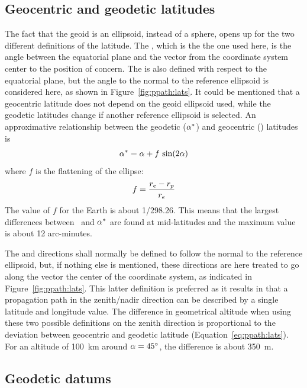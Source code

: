 \subsection{Geocentric and geodetic latitudes}
\label{sec:ppath:geolat}

The fact that the geoid is an ellipsoid, instead of a sphere, opens up
for the two different definitions of the latitude. The
, which is the the one used here, is the
angle between the equatorial plane and the vector from the coordinate
system center to the position of concern. The  is also defined with respect to the equatorial plane, but
the angle to the normal to the reference ellipsoid is considered here, as
shown in Figure~\ref{fig:ppath:lats}. It could be mentioned that a
geocentric latitude does not depend on the geoid ellipsoid used, while
the geodetic latitudes change if another reference ellipsoid is
selected. An approximative relationship between the geodetic
($\alpha^*$) and geocentric (\Lat) latitudes is \citep{montenbruck:00}
\begin{equation}
 \alpha^* = \alpha + f\,\sin(2\alpha)  
 \label{eq:ppath:lats}
\end{equation}
where $f$ is the flattening of the ellipse:
\begin{equation}
 f = \frac{r_{e}-r_{p}}{r_{e}}
 \label{eq:ppath:flattening}
\end{equation}
The value of $f$ for the Earth is about 1/298.26. This means that the
largest differences between \Lat\ and $\alpha^*$ are found at
mid-latitudes and the maximum value is about 12 arc-minutes.

The  and  directions shall normally be
defined to follow the normal to the reference ellipsoid, but, if
nothing else is mentioned, these directions are here treated to go
along the vector the center of the coordinate system, as indicated in
Figure~\ref{fig:ppath:lats}. This latter definition is preferred
as it results in that a propagation path in the zenith/nadir direction
can be described by a single latitude and longitude value. The
difference in geometrical altitude when using these two possible
definitions on the zenith direction is proportional to the deviation
between geocentric and geodetic latitude (Equation~\ref{eq:ppath:lats}).
For an altitude of 100~km around $\alpha=45^\circ$, the difference is
about 350~m.


\subsection{Geodetic datums}
\label{sec:ppath:geodatums}

